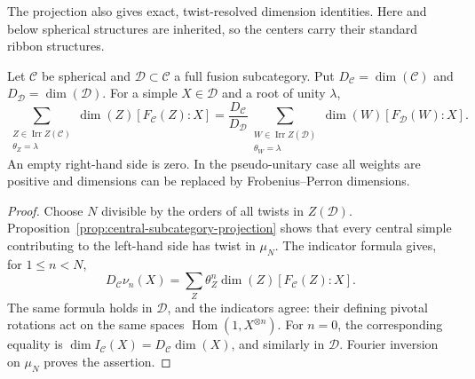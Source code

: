 The projection also gives exact, twist-resolved dimension identities.
Here and below spherical structures are inherited, so the centers carry their
standard ribbon structures.

\begin{corollary}\label{cor:subcategory-twist-masses}
Let $\mathcal C$ be spherical and $\mathcal D\subset\mathcal C$ a full fusion
subcategory. Put $D_{\mathcal C}=\dim(\mathcal C)$ and
$D_{\mathcal D}=\dim(\mathcal D)$. For a simple $X\in\mathcal D$ and a root
of unity $\lambda$,
\[
 \sum_{\substack{Z\in\operatorname{Irr}Z(\mathcal C)\\\theta_Z=\lambda}}
       \dim(Z)[F_{\mathcal C}(Z):X]
 =\frac{D_{\mathcal C}}{D_{\mathcal D}}
   \sum_{\substack{W\in\operatorname{Irr}Z(\mathcal D)\\\theta_W=\lambda}}
       \dim(W)[F_{\mathcal D}(W):X].
\]
An empty right-hand side is zero. In the pseudo-unitary case all weights are
positive and dimensions can be replaced by Frobenius--Perron dimensions.
\end{corollary}
\begin{proof}
Choose $N$ divisible by the orders of all twists in $Z(\mathcal D)$.
Proposition~\ref{prop:central-subcategory-projection} shows that every central
simple contributing to the left-hand side has twist in $\mu_N$.
The indicator formula \cite{NS} gives, for $1\le n<N$,
\[
 D_{\mathcal C}\nu_n(X)
 =\sum_Z\theta_Z^n\dim(Z)[F_{\mathcal C}(Z):X].
\]
The same formula holds in $\mathcal D$, and the indicators agree: their
defining pivotal rotations act on the same spaces
$\operatorname{Hom}(1,X^{\otimes n})$. For $n=0$, the corresponding equality
is $\dim I_{\mathcal C}(X)=D_{\mathcal C}\dim(X)$, and similarly in
$\mathcal D$. Fourier inversion on $\mu_N$ proves the assertion.
\end{proof}

